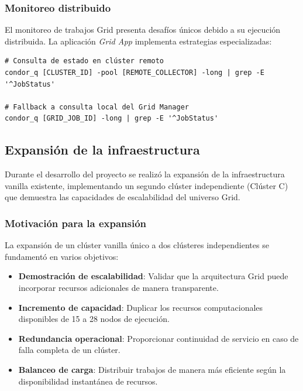 \subsubsection{Monitoreo distribuido}
\noindent

El monitoreo de trabajos Grid presenta desafíos únicos debido a su ejecución distribuida. La aplicación \textit{Grid App} implementa estrategias especializadas:

\begin{verbatim}
# Consulta de estado en clúster remoto
condor_q [CLUSTER_ID] -pool [REMOTE_COLLECTOR] -long | grep -E '^JobStatus'

# Fallback a consulta local del Grid Manager
condor_q [GRID_JOB_ID] -long | grep -E '^JobStatus'
\end{verbatim}

\subsection{Expansión de la infraestructura}
\noindent

Durante el desarrollo del proyecto se realizó la expansión de la infraestructura vanilla existente, implementando un segundo clúster independiente (Clúster C) que demuestra las capacidades de escalabilidad del universo Grid.

\subsubsection{Motivación para la expansión}
\noindent

La expansión de un clúster vanilla único a dos clústeres independientes se fundamentó en varios objetivos:

\begin{itemize}
	\item \textbf{Demostración de escalabilidad}: Validar que la arquitectura Grid puede incorporar recursos adicionales de manera transparente.

	\item \textbf{Incremento de capacidad}: Duplicar los recursos computacionales disponibles de 15 a 28 nodos de ejecución.

	\item \textbf{Redundancia operacional}: Proporcionar continuidad de servicio en caso de falla completa de un clúster.

	\item \textbf{Balanceo de carga}: Distribuir trabajos de manera más eficiente según la disponibilidad instantánea de recursos.
\end{itemize}

